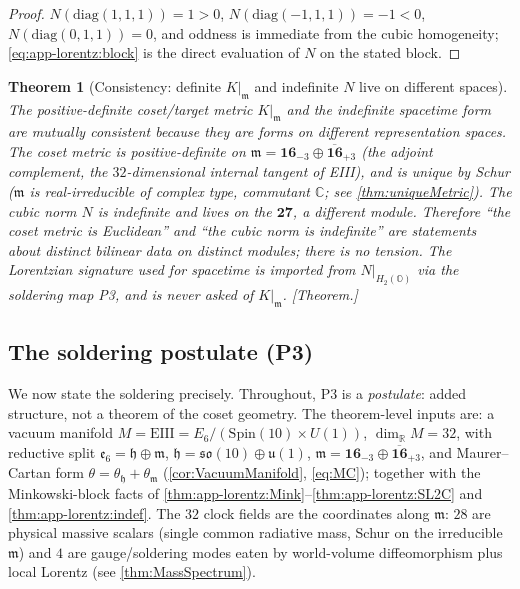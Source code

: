 \documentclass[11pt]{article}
\theoremstyle{plain}
\newtheorem{theorem}{Theorem}[section]
\theoremstyle{definition}
\theoremstyle{remark}
\begin{document}
\begin{proof}
$N(\mathrm{diag}(1,1,1))=1>0$, $N(\mathrm{diag}(-1,1,1))=-1<0$,
$N(\mathrm{diag}(0,1,1))=0$, and oddness is immediate from the cubic homogeneity;
\eqref{eq:app-lorentz:block} is the direct evaluation of $N$ on the stated block.
\end{proof}

\begin{theorem}[Consistency: definite \texorpdfstring{$K|_{\mathfrak{m}}$}{K|m} and indefinite \texorpdfstring{$N$}{N} live on different spaces]
\label{thm:app-lorentz:consistency}
The positive-definite coset/target metric $K|_{\mathfrak{m}}$ and the indefinite
spacetime form are mutually consistent because they are forms on \emph{different}
representation spaces. The coset metric is positive-definite on
$\mathfrak{m}=\mathbf{16}_{-3}\oplus\overline{\mathbf{16}}_{+3}$ (the adjoint
complement, the $32$-dimensional internal tangent of EIII), and is unique by Schur
($\mathfrak{m}$ is real-irreducible of complex type, commutant $\mathbb{C}$; see
\autoref{thm:uniqueMetric}). The cubic norm $N$ is indefinite and lives on the
$\mathbf{27}$, a \emph{different} module. Therefore ``the coset metric is Euclidean''
and ``the cubic norm is indefinite'' are statements about distinct bilinear data on
distinct modules; there is no tension. The Lorentzian signature used for spacetime is
imported from $N|_{H_{2}(\mathbb{O})}$ via the soldering map P3, and is \emph{never}
asked of $K|_{\mathfrak{m}}$. \emph{[Theorem.]}
\end{theorem}

\subsection{The soldering postulate (P3)}
\label{subsec:app-lorentz:p3}

We now state the soldering precisely. Throughout, P3 is a \emph{postulate}: added
structure, not a theorem of the coset geometry. The theorem-level inputs are: a
vacuum manifold $M=\mathrm{EIII}=E_{6}/(\mathrm{Spin}(10)\times U(1))$, $\dim_{\mathbb{R}}M=32$,
with reductive split $\mathfrak{e}_{6}=\mathfrak{h}\oplus\mathfrak{m}$,
$\mathfrak{h}=\mathfrak{so}(10)\oplus\mathfrak{u}(1)$,
$\mathfrak{m}=\mathbf{16}_{-3}\oplus\overline{\mathbf{16}}_{+3}$, and Maurer--Cartan
form $\theta=\theta_{\mathfrak{h}}+\theta_{\mathfrak{m}}$
(\autoref{cor:VacuumManifold}, \autoref{eq:MC}); together with the Minkowski-block
facts of \autoref{thm:app-lorentz:Mink}--\autoref{thm:app-lorentz:SL2C} and
\autoref{thm:app-lorentz:indef}. The $32$ clock fields are the coordinates along
$\mathfrak{m}$: $28$ are physical massive scalars (single common radiative mass,
Schur on the irreducible $\mathfrak{m}$) and $4$ are gauge/soldering modes eaten by
world-volume diffeomorphism plus local Lorentz (see \autoref{thm:MassSpectrum}).
\end{document}
